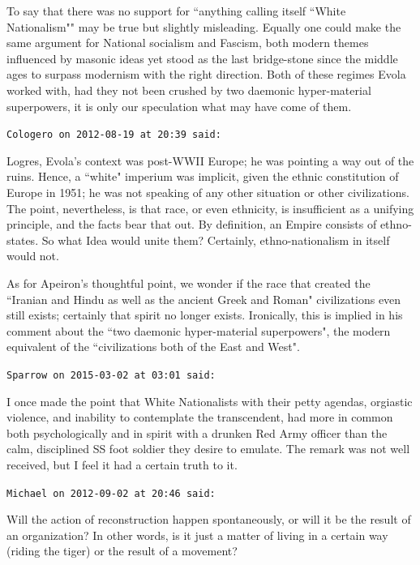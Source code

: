 \begin{footnotesize}
\begin{sffamily}
To say that there was no support for ``anything calling itself ``White Nationalism"" may be true but slightly misleading. Equally one could make the same argument for National socialism and Fascism, both modern themes influenced by masonic ideas yet stood as the last bridge-stone since the middle ages to surpass modernism with the right direction. Both of these regimes Evola worked with, had they not been crushed by two daemonic hyper-material superpowers, it is only our speculation what may have come of them.


\hfill

\texttt{Cologero on 2012-08-19 at 20:39 said: }

Logres, Evola's context was post-WWII Europe; he was pointing a way out of the ruins. Hence, a ``white" imperium was implicit, given the ethnic constitution of Europe in 1951; he was not speaking of any other situation or other civilizations. The point, nevertheless, is that race, or even ethnicity, is insufficient as a unifying principle, and the facts bear that out. By definition, an Empire consists of ethno-states. So what Idea would unite them? Certainly, ethno-nationalism in itself would not.

As for Apeiron's thoughtful point, we wonder if the race that created the ``Iranian and Hindu as well as the ancient Greek and Roman" civilizations even still exists; certainly that spirit no longer exists. Ironically, this is implied in his comment about the ``two daemonic hyper-material superpowers", the modern equivalent of the ``civilizations both of the East and West".


\hfill

\texttt{Sparrow on 2015-03-02 at 03:01 said: }

I once made the point that White Nationalists with their petty agendas, orgiastic violence, and inability to contemplate the transcendent, had more in common both psychologically and in spirit with a drunken Red Army officer than the calm, disciplined SS foot soldier they desire to emulate. The remark was not well received, but I feel it had a certain truth to it.


\hfill

\texttt{Michael on 2012-09-02 at 20:46 said: }

Will the action of reconstruction happen spontaneously, or will it be the result of an organization? In other words, is it just a matter of living in a certain way (riding the tiger) or the result of a movement?


\hfill


\end{sffamily}
\end{footnotesize}
